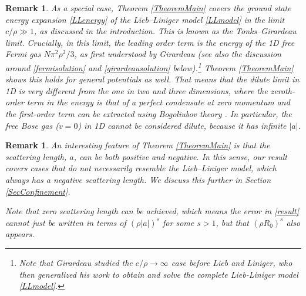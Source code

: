 \documentclass[a4paper,11pt]{article}
\newtheorem{remark}[theorem]{Remark}
\numberwithin{equation}{section}
\begin{document}
\begin{remark}
\label{remfermi}
As a special case, Theorem \ref{TheoremMain} covers the ground state energy expansion \eqref{LLenergy} of the Lieb--Liniger model \eqref{LLmodel} in the limit $c/\rho\gg1$, as discussed in the introduction. This is known as the Tonks--Girardeau limit. Crucially, in this limit, the leading order term is the energy of the 1D free Fermi gas $N\pi^2\rho^2/3$, as first understood by Girardeau \cite{girardeau1960relationship} (see also the discussion around \eqref{fermisolution} and \eqref{girardeausolution} below).\footnote{Note that Girardeau studied the $c/\rho\to\infty$ case before Lieb and Liniger, who then generalized his work to obtain and solve the complete Lieb-Liniger model \eqref{LLmodel}.} Theorem \ref{TheoremMain} shows this holds for general potentials as well. That means that the dilute limit in 1D is very different from the one in two and three dimensions, where the zeroth-order term in the energy is that of a perfect condensate at zero momentum and the first-order term can be extracted using Bogoliubov theory \cite{bogoliubov1947theory}. In particular, the free Bose gas ($v=0$) in 1D cannot be considered dilute, because it has infinite $|a|$.  
\end{remark}
\pagebreak
\begin{remark}
An interesting feature of Theorem \ref{TheoremMain} is that the scattering length, $a$, can be both positive and negative. In this sense, our result covers cases that do not necessarily resemble the Lieb--Liniger model, which always has a negative scattering length. We discuss this further in Section \ref{SecConfinement}. 

Note that zero scattering length can be achieved, which means the error in \eqref{result} cannot just be written in terms of $(\rho|a|)^s$ for some $s>1$, but that $(\rho R_0)^s$ also appears.
\end{remark}
\end{document}
